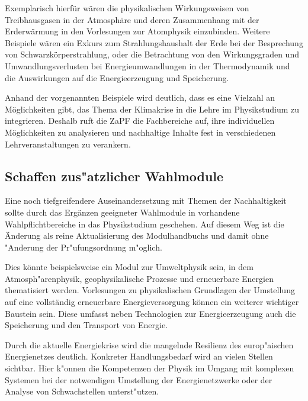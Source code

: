 \documentclass[DIV=calc]{scrartcl}
\begin{document}
Exemplarisch hierfür wären die physikalischen Wirkungsweisen von Treibhausgasen in der Atmosphäre und deren Zusammenhang mit der Erderwärmung in den Vorlesungen zur Atomphysik einzubinden. Weitere Beispiele wären ein Exkurs zum Strahlungshaushalt der Erde bei der Besprechung von Schwarzkörperstrahlung, oder die Betrachtung von den Wirkungsgraden und Umwandlungsverlusten bei Energieumwandlungen in der Thermodynamik und die Auswirkungen auf die Energieerzeugung und Speicherung. 

Anhand der vorgenannten Beispiele wird deutlich, dass es eine Vielzahl an Möglichkeiten gibt, das Thema der Klimakrise in die Lehre im Physikstudium zu integrieren. Deshalb ruft die ZaPF die Fachbereiche auf, ihre individuellen Möglichkeiten zu analysieren und nachhaltige Inhalte fest in verschiedenen Lehrveranstaltungen zu verankern. 


\subsection*{Schaffen zus"atzlicher Wahlmodule}
Eine noch tiefgreifendere Auseinandersetzung mit Themen der Nachhaltigkeit sollte durch das Ergänzen geeigneter Wahlmodule in vorhandene Wahlpflichtbereiche in das Physikstudium geschehen. Auf diesem Weg ist die Änderung als reine Aktualisierung des Modulhandbuchs und damit ohne "Anderung der Pr"ufungsordnung m"oglich.

Dies könnte beispielsweise ein Modul zur Umweltphysik sein, in dem Atmosph"arenphysik, geophysikalische Prozesse und erneuerbare Energien thematisiert werden. Vorlesungen zu physikalischen Grundlagen der Umstellung auf eine vollständig erneuerbare Energieversorgung können ein weiterer wichtiger Baustein sein. Diese umfasst neben Technologien zur Energieerzeugung auch die Speicherung und den Transport von Energie.

Durch die aktuelle Energiekrise wird die mangelnde Resilienz des europ"aischen Energienetzes deutlich. Konkreter Handlungsbedarf wird an vielen Stellen sichtbar. Hier k"onnen die Kompetenzen der Physik im Umgang mit komplexen Systemen bei der notwendigen Umstellung der Energienetzwerke oder der Analyse von Schwachstellen unterst"utzen.
\end{document}
